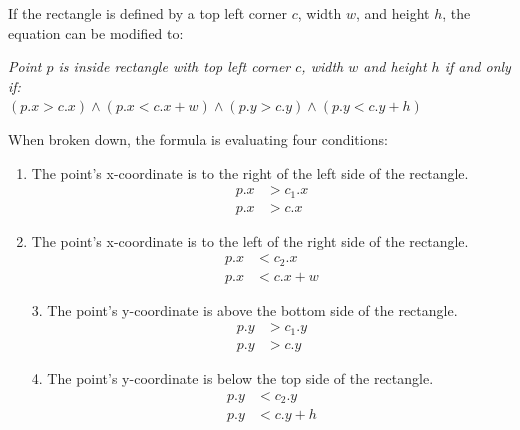 If the rectangle is defined by a top left corner $c$, width $w$, and height
$h$, the equation can be modified to:

\begin{center}
    \textit{Point $p$ is inside rectangle with top left corner $c$, width $w$ and height $h$ if and only if:} \\
    $(p.x > c.x) \land (p.x < c.x + w) \land (p.y > c.y) \land (p.y < c.y + h)$
\end{center}
When broken down, the formula is evaluating four conditions:
\begin{multicols}{2}
    \begin{enumerate}
        \item The point's x-coordinate is to the right of the left side of the rectangle.
              \begin{equation*}
                  \begin{aligned}
                      p.x & > c_1.x \\
                      p.x & > c.x
                  \end{aligned}
              \end{equation*}

        \item The point's x-coordinate is to the left of the right side of the rectangle.
              \begin{equation*}
                  \begin{aligned}
                      p.x & < c_2.x   \\
                      p.x & < c.x + w
                  \end{aligned}
              \end{equation*}
    \end{enumerate}
\end{multicols}

\begin{multicols}{2}
    \begin{enumerate}
        \item[3.]The point's y-coordinate is above the bottom side of the rectangle.
        \begin{equation*}
            \begin{aligned}
                p.y & > c_1.y \\
                p.y & > c.y
            \end{aligned}
        \end{equation*}

        \item[4.] The point's y-coordinate is below the top side of the rectangle.
            \begin{equation*}
                \begin{aligned}
                    p.y & < c_2.y   \\
                    p.y & < c.y + h
                \end{aligned}
            \end{equation*}
    \end{enumerate}
\end{multicols}
\newpage

